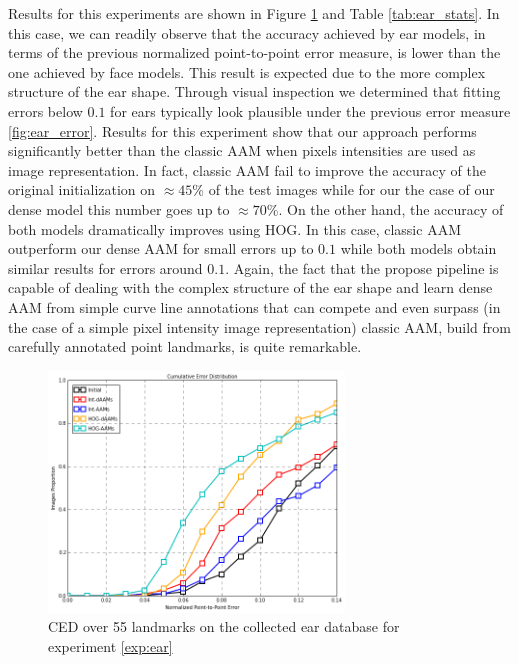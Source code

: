 Results for this experiments are shown in Figure \ref{fig:ear_ced} and Table \ref{tab:ear_stats}. In this case, we can readily observe that the accuracy achieved by ear models, in terms of the previous normalized point-to-point error measure, is lower than the one achieved by face models. This result is expected due to the more complex structure of the ear shape. Through visual inspection we determined that fitting errors below $0.1$ for ears typically look plausible under the previous error measure \ref{fig:ear_error}. Results for this experiment show that our approach performs significantly better than the classic AAM when pixels intensities are used as image representation. In fact, classic AAM fail to improve the accuracy of the original initialization on $\approx45\%$ of the test images while for our the case of our dense model this number goes up to $\approx70\%$. On the other hand, the accuracy of both models dramatically improves using HOG. In this case, classic AAM outperform our dense AAM for small errors up to $0.1$ while both models obtain similar results for errors around $0.1$. Again, the fact that the propose pipeline is capable of dealing with the complex structure of the ear shape and learn dense AAM from simple curve line annotations that can compete and even surpass (in the case of a simple pixel intensity image representation) classic AAM, build from carefully annotated point landmarks, is quite remarkable. 

\begin{figure}[h]
\centering
\includegraphics[width=0.7\textwidth]{resources/Fig_Alignment/ear_ced}
\caption{CED over 55 landmarks on the collected ear database for experiment \ref{exp:ear}}
\label{fig:ear_ced}
\end{figure}

